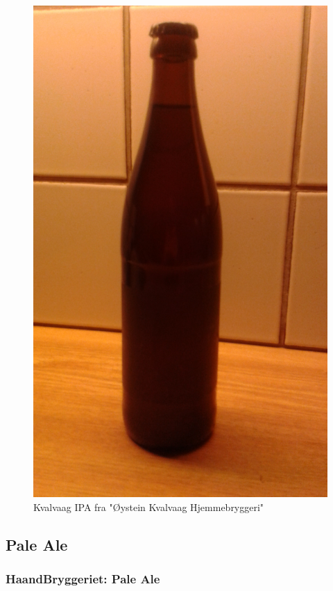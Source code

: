 \documentclass[12pt,a4paper,oneside,norsk]{article}
\begin{document}
\begin{figure} [H]
\centering
\includegraphics[scale=0.1, angle=270]{Bilder/Ol/KvalvaagIPA}
\caption{Kvalvaag IPA fra "Øystein Kvalvaag Hjemmebryggeri"}
\end{figure}

\newpage
\subsection{Pale Ale}
\subsubsection{HaandBryggeriet: Pale Ale}
\end{document}
